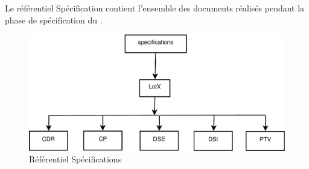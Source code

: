 Le référentiel Spécification contient l’ensemble des documents réalisés pendant la phase de spécification du \PICCourt.

\clearpage

\begin{figure}[ht]
         \begin{center}
         \includegraphics[scale=0.50]{images/arboSpecifications}
         \end{center}
         \caption{Référentiel Spécifications}
 \end{figure}
